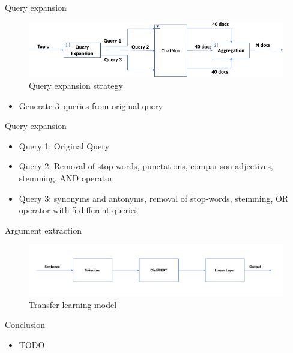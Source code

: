\documentclass[english]{mlutalk}
\begin{document}
\begin{frame}[allowframebreaks]{Query expansion}
  \begin{figure}
    \centering
    \includegraphics[width=0.8\linewidth]{figures/distilbert-based-arg-retrieval-query-expansion.pdf}
    \caption{Query expansion strategy~\cite{AlhamzehBEM2021}}
    \label{query-expansion}
  \end{figure}

  \begin{itemize}
    \item Generate 3~queries from original query
  \end{itemize}
\end{frame}

\begin{frame}{Query expansion}
  \begin{itemize}
    \item Query 1: Original Query
    \item Query 2: Removal of stop-words, punctations, comparison adjectives, stemming, AND operator
    \item Query 3: synonyms and antonyms, removal of stop-words, stemming, OR operator with 5 different queries
  \end{itemize}
\end{frame}

\begin{frame}{Argument extraction~\cite{AlhamzehBEM2021}}
  \begin{figure}
    \centering
    \includegraphics[width=1\linewidth]{figures/distilbert-based-arg-retrieval-processing.pdf}
    \caption{Transfer learning model~\cite{AlhamzehBEM2021}}
    \label{processing}
  \end{figure}
\end{frame}

\begin{frame}{Conclusion}
  \begin{itemize}
    \item TODO
  \end{itemize}
  \thankyou
\end{frame}

\appendix
\section{\appendixname}

\bibliographyframe
\end{document}
